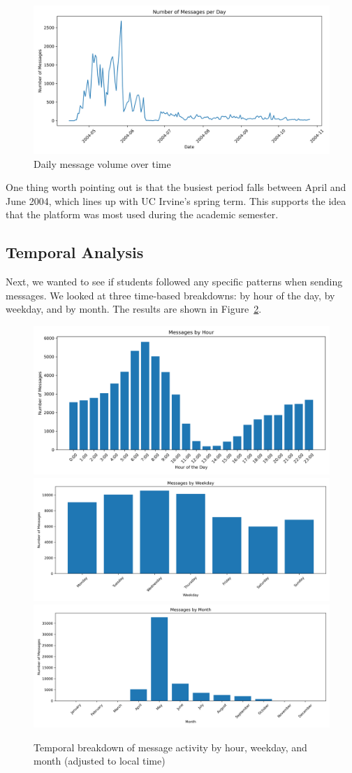 \begin{figure}[H]
    \centering
    \includegraphics[width=0.5\linewidth]{../Images/messages_per_day.png}
    \caption{Daily message volume over time}
    \label{fig:messages-per-day}
\end{figure}

One thing worth pointing out is that the busiest period falls between April and June 2004, which lines up with UC Irvine's spring term. This supports the idea that the platform was most used during the academic semester.

\subsection{Temporal Analysis}

Next, we wanted to see if students followed any specific patterns when sending messages. We looked at three time-based breakdowns: by hour of the day, by weekday, and by month. The results are shown in Figure~\ref{fig:temporal-analysis}.

\begin{figure}[H]
    \centering
    \includegraphics[width=0.3\linewidth]{../Images/messages_by_hourWrong.png}
    \includegraphics[width=0.3\linewidth]{../Images/messages_by_weekday.png}
    \includegraphics[width=0.3\linewidth]{../Images/messages_by_month.png}
    \caption{Temporal breakdown of message activity by hour, weekday, and month (adjusted to local time)}
    \label{fig:temporal-analysis}
\end{figure}


